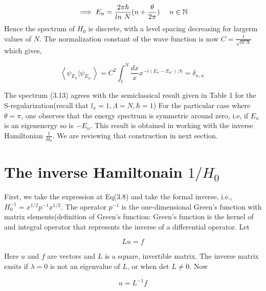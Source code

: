 \documentclass[12pt]{report}
\newcommand*{\1}{\hspace{1pt}}
\begin{document}
        \begin{equation}
            \implies E_{n}  = \frac{2\pi\hbar}{ln \ N}(n+\frac{\theta}{2\pi})  \ \ \ \ n \in \mathbb{N}\\
        \end{equation}
        Hence the spectrum of $H_{0}$ is discrete, with a level spacing decreasing for largerm values of $N$. The normalization constant of the wave function is now 
        $C = \frac{1}{\sqrt{ln \ N}}$ which gives,

        \begin{equation}
            \left\langle\psi_{E_{n}}|\psi_{E_{n'}}\right\rangle = C^{2} \int_{1}^{N} \frac{dx}{x} x^{-i(E_{n}-E_{n'})/\hbar} = \delta_{n,n^{'}}
        \end{equation}
        
        The spectrum (3.13) agrees with the semiclassical result given in Table 1 for the S-regularization(recall that $l_{x} = 1, \Lambda = N, \hbar=1$)
        For the particular case where $\theta=\pi$, one observes that the energy spectrum is symmetric around zero, i.e, if $E_{n}$ is an eigenenergy so is $-E_{n}$.
        This result is obtained in working\cite{s10} with the inverse Hamiltonian $\frac{1}{H_{0}}$. We are reviewing that construction in next section.

        \section{The inverse Hamiltonain $1/H_{0}$}

        First, we take the expression at Eq(3.8) and take the formal inverse, i.e., $H_{0} ^{-1} = x^{1/2}p^{-1}x^{1/2}$. The operator $p^{-1}$ is the one-dimensional
        Green's function with matrix elements(definition of Green's function: Green's function is the kernel of and integral operator that represents the inverse
        of a differential operator. Let 

        \begin{equation}
                Lu = f
        \end{equation}

        Here $u$ and $f$ are vectors and $L$ is a square, invertible matrix. The inverse matrix exsits if $\lambda=0$ is not an eigenvalue of $L$, or when det $ L \neq 0$.
        Now

        \begin{equation}
            u = L^{-1}f
        \end{equation}
\end{document}

